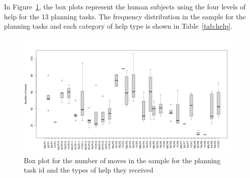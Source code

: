 In Figure~\ref{fig:helpsbypid}, the box plots represent the human subjects using the four levels of help for the 13 planning tasks.
The frequency distribution in the sample for the planning tasks and each category of help type is shown in Table~\ref{tab:help}.
\begin{table}[tpb]
\centering
{}
\caption{Frequency distribution in the sample for the planning task id and the types of help}
\label{tab:help}
\end{table}

\begin{figure}[tpb]
  \centering
\includegraphics[width=\columnwidth]{img/helpsbypid.png}
  \caption{Box plot for the number of moves in the sample for the planning task id and the types of help they received}
  \label{fig:helpsbypid}
\end{figure}


